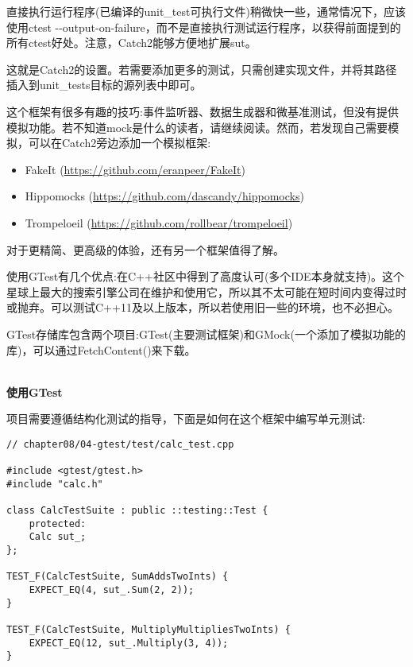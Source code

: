 直接执行运行程序(已编译的unit\_test可执行文件)稍微快一些，通常情况下，应该使用ctest -{}-output-on-failure，而不是直接执行测试运行程序，以获得前面提到的所有ctest好处。注意，Catch2能够方便地扩展sut。

这就是Catch2的设置。若需要添加更多的测试，只需创建实现文件，并将其路径插入到unit\_tests目标的源列表中即可。

这个框架有很多有趣的技巧:事件监听器、数据生成器和微基准测试，但没有提供模拟功能。若不知道mock是什么的读者，请继续阅读。然而，若发现自己需要模拟，可以在Catch2旁边添加一个模拟框架:

\begin{itemize}
\item 
FakeIt (\url{https://github.com/eranpeer/FakeIt})

\item 
Hippomocks (\url{https://github.com/dascandy/hippomocks})

\item 
Trompeloeil (\url{https://github.com/rollbear/trompeloeil})
\end{itemize}

对于更精简、更高级的体验，还有另一个框架值得了解。


使用GTest有几个优点:在C++社区中得到了高度认可(多个IDE本身就支持)。这个星球上最大的搜索引擎公司在维护和使用它，所以其不太可能在短时间内变得过时或抛弃。可以测试C++11及以上版本，所以若使用旧一些的环境，也不必担心。

GTest存储库包含两个项目:GTest(主要测试框架)和GMock(一个添加了模拟功能的库)，可以通过FetchContent()来下载。

\hspace*{\fill} \\ %
\noindent
\textbf{使用GTest}

项目需要遵循结构化测试的指导，下面是如何在这个框架中编写单元测试:

\begin{lstlisting}[style=styleCXX]
// chapter08/04-gtest/test/calc_test.cpp

#include <gtest/gtest.h>
#include "calc.h"

class CalcTestSuite : public ::testing::Test {
	protected:
	Calc sut_;
};

TEST_F(CalcTestSuite, SumAddsTwoInts) {
	EXPECT_EQ(4, sut_.Sum(2, 2));
}

TEST_F(CalcTestSuite, MultiplyMultipliesTwoInts) {
	EXPECT_EQ(12, sut_.Multiply(3, 4));
}
\end{lstlisting} 

